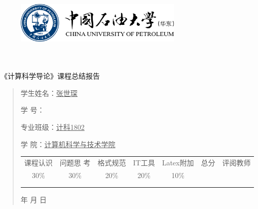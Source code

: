 \documentclass{article}
\renewcommand{\today}{\number\year 年 \number\month 月 \number\day 日}
\begin{document}
\begin{figure}
    \centering
    \includegraphics[width=8cm]{upc.png}

    \label{figupc}
\end{figure}

	\begin{center}
		\quad \\
		\quad \\
		\heiti \fontsize{45}{17} \quad \quad \quad 
		\vskip 1.5cm
		\heiti {} 《计算科学导论》课程总结报告
	\end{center}
	\vskip 2.0cm
		
	\begin{quotation}
		\doublespacing
		
        \par\setlength\parindent{7em}
		\quad 

		学生姓名：\underline{\qquad  张世琛 \qquad \qquad}

		学\hspace{0.61cm} 号：\underline{\qquad}
		
		专业班级：\underline{\qquad 计科1802 \qquad  }
		
        学\hspace{0.61cm} 院：\underline{计算机科学与技术学院}
		\vskip 2cm
		\centering
		\begin{table}[h]
            \centering 
            \begin{tabular}{|c|c|c|c|c|c|c|}
                \hline
                课程认识 & 问题思 考 & 格式规范  & IT工具  & Latex附加  & 总分 & 评阅教师 \\
                30\% & 30\% & 20\% & 20\% & 10\% &  &  \\
                \hline
                 & & & & & &\\
                & & & & & &\\
                \hline
            \end{tabular}
        \end{table}
		\vskip 2cm
		\today
	\end{quotation}
\end{document}
